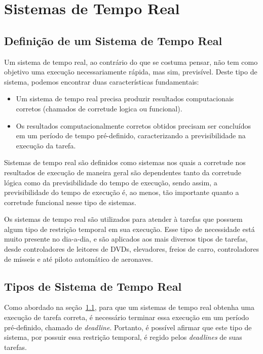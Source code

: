 \section{Sistemas de Tempo Real}
\label{sec:STR}

\subsection{Definição de um Sistema de Tempo Real}
\label{sec:DefSTR}
Um sistema de tempo real, ao contrário do que se costuma pensar, não tem
como objetivo uma execução necessariamente rápida, mas sim, previsível.
Deste tipo de sistema, podemos encontrar duas características fundamentais:

\begin{itemize}
\item Um sistema de tempo real precisa produzir resultados computacionais corretos
(chamados de corretude logica ou funcional).
\item Os resultados computacionalmente corretos obtidos precisam ser concluídos em
um período de tempo pré-definido, caracterizando a previsibilidade na execução da tarefa.
\end{itemize}

Sistemas de tempo real são definidos como sistemas nos quais a corretude nos
resultados de execução de maneira geral são dependentes tanto da corretude
lógica como da previsibilidade do tempo de execução, sendo assim, a previsibilidade
do tempo de execução é, ao menos, tão importante quanto a corretude funcional
nesse tipo de sistemas.~\cite{Li:2003:RCE:829584}

Os sistemas de tempo real são utilizados para atender à tarefas que possuem algum tipo
de restrição temporal em sua execução. Esse tipo de necessidade está muito presente no
dia-a-dia, e são aplicados aos mais diversos tipos de tarefas, desde controladores de
leitores de DVDs, elevadores, freios de carro, controladores de mísseis e até piloto automático
de aeronaves.

\subsection{Tipos de Sistema de Tempo Real}
Como abordado na seção~\ref{sec:DefSTR}, para que um sistemas de tempo real obtenha uma
execução de tarefa correta, é necessário terminar essa execução em um período pré-definido,
chamado de \textit{deadline}. Portanto, é possível afirmar que este tipo de sistema, por possuir
essa restrição temporal, é regido pelos \textit{deadlines} de suas tarefas.

